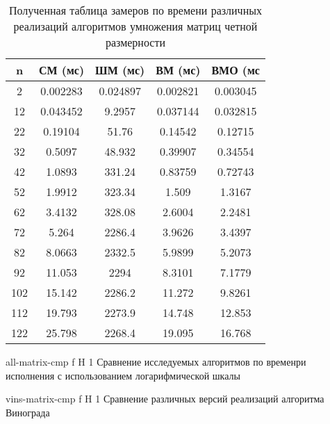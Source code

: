 \begin{table}[!ht]
	\centering
	\caption{Полученная таблица замеров по времени различных реализаций алгоритмов умножения матриц четной размерности}
	\begin{tabular}{|c|c|c|c|c|}
		\hline
		n   & СМ (мс)  & ШМ (мс)  & ВМ (мс)  & ВМО (мс  \\ \hline
		2   & 0.002283 & 0.024897 & 0.002821 & 0.003045 \\ \hline
		12  & 0.043452 & 9.2957   & 0.037144 & 0.032815 \\ \hline
		22  & 0.19104  & 51.76    & 0.14542  & 0.12715  \\ \hline
		32  & 0.5097   & 48.932   & 0.39907  & 0.34554  \\ \hline
		42  & 1.0893   & 331.24   & 0.83759  & 0.72743  \\ \hline
		52  & 1.9912   & 323.34   & 1.509    & 1.3167   \\ \hline
		62  & 3.4132   & 328.08   & 2.6004   & 2.2481   \\ \hline
		72  & 5.264    & 2286.4   & 3.9626   & 3.4397   \\ \hline
		82  & 8.0663   & 2332.5   & 5.9899   & 5.2073   \\ \hline
		92  & 11.053   & 2294     & 8.3101   & 7.1779   \\ \hline
		102 & 15.142   & 2286.2   & 11.272   & 9.8261   \\ \hline
		112 & 19.793   & 2273.9   & 14.748   & 12.853   \\ \hline
		122 & 25.798   & 2268.4   & 19.095   & 16.768   \\ \hline
	\end{tabular}
	\label{t:timings_even}
\end{table}



{all-matrix-cmp} %
{f} %
{H} %
{1\textwidth} %
{Сравнение исследуемых алгоритмов по временри исполнения с использованием логарифмической шкалы} %

{vins-matrix-cmp} %
{f} %
{H} %
{1\textwidth} %
{Сравнение различных версий реализаций алгоритма Винограда} %


